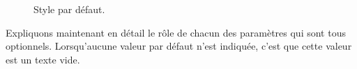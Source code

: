 \documentclass[12pt,a4paper]{scrartcl}
\theoremstyle{definition}
\begin{document}
\begin{figure}[!tbp]
  \setlength{\fboxrule}{1.5pt}
  \centering
  \hfill
  \caption{Style par défaut.}
  \label{style:default}
\end{figure}

Expliquons maintenant en détail le rôle de chacun des paramètres qui sont tous optionnels. Lorsqu'aucune valeur par défaut n'est indiquée, c'est que cette valeur est un texte vide.
\end{document}

